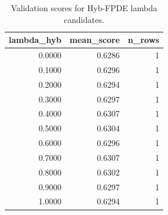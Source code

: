 \begin{table}[t]
\caption{Validation scores for Hyb-FPDE lambda candidates.}
\label{tab:lambda_distribution_computed}
\centering
\begin{tabular}{rrr}
\toprule
lambda\_hyb & mean\_score & n\_rows \\
\midrule
0.0000 & 0.6286 & 1 \\
0.1000 & 0.6296 & 1 \\
0.2000 & 0.6294 & 1 \\
0.3000 & 0.6297 & 1 \\
0.4000 & 0.6307 & 1 \\
0.5000 & 0.6304 & 1 \\
0.6000 & 0.6296 & 1 \\
0.7000 & 0.6307 & 1 \\
0.8000 & 0.6302 & 1 \\
0.9000 & 0.6297 & 1 \\
1.0000 & 0.6294 & 1 \\
\bottomrule
\end{tabular}

\end{table}
